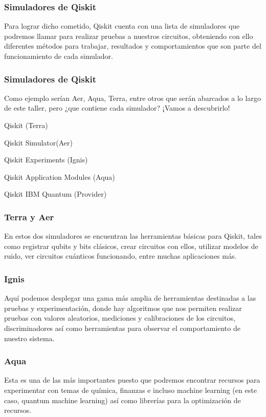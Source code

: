 \documentclass[spanish]{beamer}
\begin{document}
\newpage\justify\setlength{\parskip}{5mm}
\begin{frame}\frametitle{Simuladores de Qiskit} 
Para lograr dicho cometido, Qiskit cuenta con una lista de simuladores que podremos llamar para realizar pruebas a nuestros circuitos, obteniendo con ello diferentes métodos para trabajar, resultados y comportamientos que son parte del funcionamiento de cada simulador. 
\end{frame} 

\newpage\justify\setlength{\parskip}{5mm}
\begin{frame}\frametitle{Simuladores de Qiskit} 
Como ejemplo serían Aer, Aqua, Terra, entre otros que serán abarcados a lo largo de este taller, pero ¿que contiene cada simulador? ¡Vamos a descubrirlo!
\begin{itemsize}
\item Qiskit (Terra)
    \item Qiskit Simulator(Aer)
    \item Qiskit Experiments (Ignis)
    \item Qiskit Application Modules (Aqua)
    \item Qiskit IBM Quantum (Provider)
\end{itemsize}
\end{frame} 

\newpage\justify\setlength{\parskip}{5mm}
\begin{frame}\frametitle{Terra y Aer} 
En estos dos simuladores se encuentran las herramientas básicas para Qiskit, tales como registrar qubits y bits clásicos, crear circuitos con ellos, utilizar modelos de ruido, ver circuitos cuánticos funcionando, entre muchas aplicaciones más.
\end{frame} 

\newpage\justify\setlength{\parskip}{5mm}
\begin{frame}\frametitle{Ignis} 
Aquí podemos desplegar una gama más amplia de herramientas destinadas a las pruebas y experimentación, donde hay algoritmos que nos permiten realizar pruebas con valores aleatorios, mediciones y calibraciones de los circuitos, discriminadores  así como herramientas para observar el comportamiento de nuestro sistema.
\end{frame} 

\newpage\justify\setlength{\parskip}{5mm}
\begin{frame}\frametitle{Aqua} 
Esta es una de las más importantes puesto que podremos encontrar recursos para experimentar con temas de química, finanzas e incluso machine learning (en este caso, quantum machine learning) así como librerías para la optimización de recursos.
\end{frame} 
\end{document}
